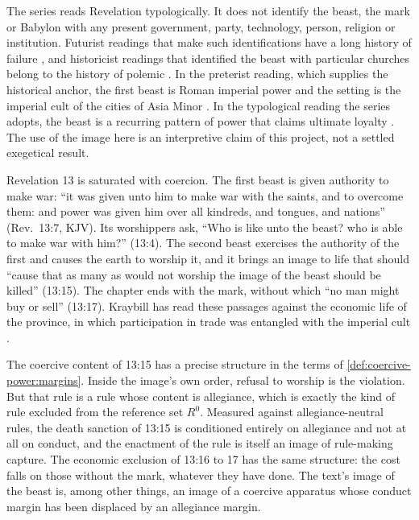 \documentclass[11pt,letterpaper]{article}
\theoremstyle{definition}
\theoremstyle{remark}
\begin{document}
The series reads Revelation typologically. It does not identify the beast, the mark or Babylon with any present government, party, technology, person, religion or institution. Futurist readings that make such identifications have a long history of failure \citep{boyer1992,fuller1995,mcginn1998}, and historicist readings that identified the beast with particular churches belong to the history of polemic \citep{kovacs2004}. In the preterist reading, which supplies the historical anchor, the first beast is Roman imperial power and the setting is the imperial cult of the cities of Asia Minor \citep{bauckham1993,friesen2001,koester2014}. In the typological reading the series adopts, the beast is a recurring pattern of power that claims ultimate loyalty \citep{bauckham1993,wink1992}. The use of the image here is an interpretive claim of this project, not a settled exegetical result.

Revelation 13 is saturated with coercion. The first beast is given authority to make war: ``it was given unto him to make war with the saints, and to overcome them: and power was given him over all kindreds, and tongues, and nations'' (Rev.~13:7, KJV). Its worshippers ask, ``Who is like unto the beast? who is able to make war with him?'' (13:4). The second beast exercises the authority of the first and causes the earth to worship it, and it brings an image to life that should ``cause that as many as would not worship the image of the beast should be killed'' (13:15). The chapter ends with the mark, without which ``no man might buy or sell'' (13:17). Kraybill has read these passages against the economic life of the province, in which participation in trade was entangled with the imperial cult \citep{kraybill1996}.

The coercive content of 13:15 has a precise structure in the terms of \cref{def:coercive-power:margins}. Inside the image's own order, refusal to worship is the violation. But that rule is a rule whose content is allegiance, which is exactly the kind of rule excluded from the reference set $R^0$. Measured against allegiance-neutral rules, the death sanction of 13:15 is conditioned entirely on allegiance and not at all on conduct, and the enactment of the rule is itself an image of rule-making capture. The economic exclusion of 13:16 to 17 has the same structure: the cost falls on those without the mark, whatever they have done. The text's image of the beast is, among other things, an image of a coercive apparatus whose conduct margin has been displaced by an allegiance margin.
\end{document}
